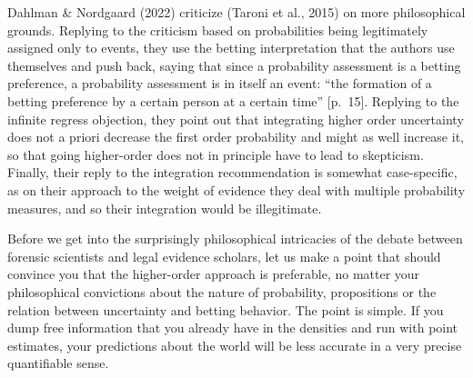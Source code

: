 \documentclass[
  10pt,
  dvipsnames,enabledeprecatedfontcommands]{scrartcl}
\begin{document}
Dahlman \& Nordgaard (2022) criticize (Taroni et al., 2015) on more
philosophical grounds. Replying to the criticism based on probabilities
being legitimately assigned only to events, they use the betting
interpretation that the authors use themselves and push back, saying
that since a probability assessment is a betting preference, a
probability assessment is in itself an event: ``the formation of a
betting preference by a certain person at a certain time'' {[}p.~15{]}.
Replying to the infinite regress objection, they point out that
integrating higher order uncertainty does not a priori decrease the
first order probability and might as well increase it, so that going
higher-order does not in principle have to lead to skepticism. Finally,
their reply to the integration recommendation is somewhat case-specific,
as on their approach to the weight of evidence they deal with multiple
probability measures, and so their integration would be illegitimate.

Before we get into the surprisingly philosophical intricacies of the
debate between forensic scientists and legal evidence scholars, let us
make a point that should convince you that the higher-order approach is
preferable, no matter your philosophical convictions about the nature of
probability, propositions or the relation between uncertainty and
betting behavior. The point is simple. If you dump free information that
you already have in the densities and run with point estimates, your
predictions about the world will be less accurate in a very precise
quantifiable sense.
\end{document}
